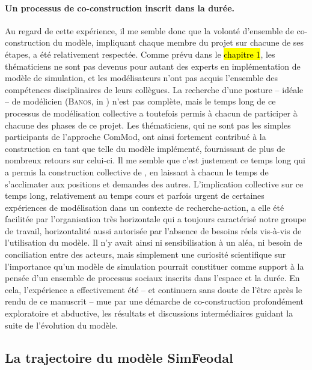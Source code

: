\paragraph{Un processus de co-construction inscrit dans la durée.}
Au regard de cette expérience, il me semble donc que la volonté d'ensemble de co-construction du modèle, impliquant chaque membre du projet sur chacune de ses étapes, a été relativement respectée.
Comme prévu dans le \hl{chapitre 1}, les \og thématiciens\fg{} ne sont pas devenus pour autant des experts en implémentation de modèle de simulation, et les \og modélisateurs\fg{} n'ont pas acquis l'ensemble des compétences disciplinaires de leurs collègues.
La recherche d'une posture -- idéale -- de \og modélicien\fg{} (\textsc{Banos}, in \cite[484]{ouriachi_lelaboration_2017}) n'est pas complète, mais le temps long de ce processus de modélisation collective a toutefois permis à chacun de participer à chacune des phases de ce projet.
Les thématiciens, qui ne sont pas les simples \og participants\fg{} de l'approche ComMod, ont ainsi fortement contribué à la construction en tant que telle du modèle implémenté, fournissant de plus de nombreux retours sur celui-ci.
Il me semble que c'est justement ce temps long qui a permis la construction collective de \simfeodal{}, en laissant à chacun le temps de s'acclimater aux positions et demandes des autres.
L'implication collective sur ce temps long, relativement au temps cours et parfois urgent de certaines expériences de modélisation dans un contexte de recherche-action, a elle été facilitée par l'organisation très horizontale qui a toujours caractérisé notre groupe de travail, horizontalité aussi autorisée par l'absence de besoins réels vis-à-vis de l'utilisation du modèle.
Il n'y avait ainsi ni sensibilisation à un aléa, ni besoin de conciliation entre des acteurs, mais simplement une curiosité scientifique sur l'importance qu'un modèle de simulation pourrait constituer comme support à la pensée d'un ensemble de processus sociaux inscrits dans l'espace et la durée.
En cela, l'expérience \simfeodal{} a effectivement été -- et continuera sans doute de l'être après le rendu de ce manuscrit -- mue par une démarche de co-construction profondément exploratoire et abductive, les résultats et discussions intermédiaires guidant la suite de l'évolution du modèle.

\subsection{La trajectoire du modèle SimFeodal}

